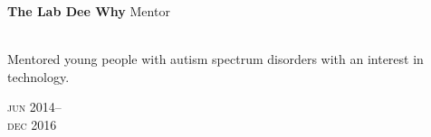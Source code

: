 

\begin{minipage}[t]{\mainboxwidth\textwidth}
\textbf{The Lab Dee Why}\phantom{..} Mentor \\
\\
{\small
Mentored young people with autism spectrum disorders with an interest in technology.
\par}
\end{minipage}
\begin{minipage}[t]{\detailboxwidth\textwidth}
{
\hfill \textsc{jun} 2014--\\ 
\hspace*{0pt} \hfill \textsc{dec} 2016
\par
}
\end{minipage}
\\


